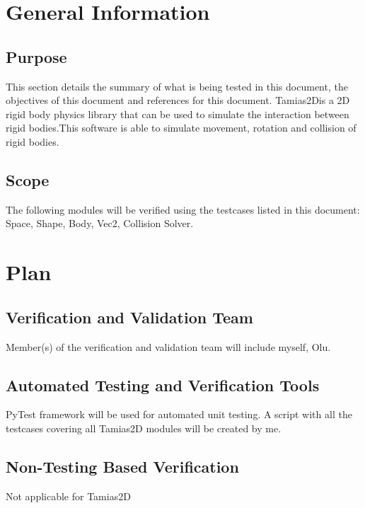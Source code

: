 \documentclass[12pt, titlepage]{article}
\newcommand{\progname}{Tamias2D}
\begin{document}

\section{General Information}
\subsection{Purpose}

This section details the summary of what is being tested in this document, the objectives of this document and references for this document. \progname is a 2D rigid body physics library that can be used to simulate the interaction between rigid bodies.This software is able to simulate movement, rotation and collision of rigid bodies.

\subsection{Scope}
The following modules will be verified using the testcases listed in this document:
Space, Shape, Body, Vec2, Collision Solver. 

\section{Plan}
	
\subsection{Verification and Validation Team}

Member(s) of the verification and validation team will include myself, Olu.

\subsection{Automated Testing and Verification Tools}
PyTest framework will be used for automated unit
testing. A script with all the testcases covering all \progname{} modules  will be created by me. 


\subsection{Non-Testing Based Verification}
Not applicable for \progname

\end{document}
